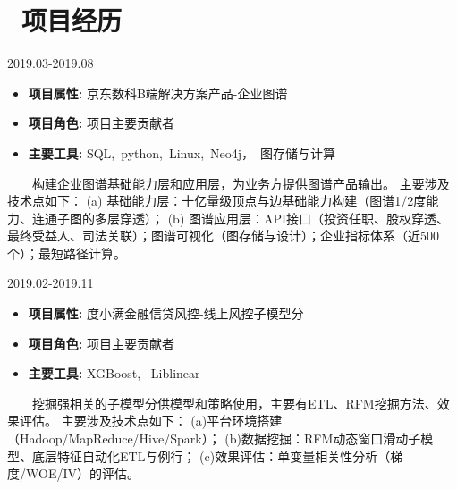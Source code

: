 \documentclass{resume}
\begin{document}
\medskip










\section{   \faUsers    \ 项目经历}


                      {2019.03-2019.08}

\begin{itemize}  [parsep=0.5ex]

  \item   \textbf{  项目属性:  }   {  京东数科B端解决方案产品-企业图谱  }                
  \item   \textbf{  项目角色:  }   {  项目主要贡献者  }
  \item   \textbf{  主要工具:  }   {  SQL,\ python,\ Linux,\ Neo4j，\ 图存储与计算 }

\end{itemize}


{    \ \ \ \ 构建企业图谱基础能力层和应用层，为业务方提供图谱产品输出。
主要涉及技术点如下：
(a) 基础能力层：十亿量级顶点与边基础能力构建（图谱1/2度能力、连通子图的多层穿透）；
(b) 图谱应用层：API接口（投资任职、股权穿透、最终受益人、司法关联）；图谱可视化（图存储与设计）；企业指标体系（近500个）；最短路径计算。 }

\medskip










                      {2019.02-2019.11}

\begin{itemize}  [parsep=0.5ex]

  \item   \textbf{  项目属性:  }   {  度小满金融信贷风控-线上风控子模型分  }                
  \item   \textbf{  项目角色:  }   {  项目主要贡献者  }
  \item   \textbf{  主要工具:  }   {  XGBoost, \ Liblinear  }

\end{itemize}


{    \ \ \ \ 挖掘强相关的子模型分供模型和策略使用，主要有ETL、RFM挖掘方法、效果评估。
主要涉及技术点如下：
(a)平台环境搭建（Hadoop/MapReduce/Hive/Spark）；
(b)数据挖掘：RFM动态窗口滑动子模型、底层特征自动化ETL与例行；
(c)效果评估：单变量相关性分析（梯度/WOE/IV）的评估。}
\end{document}
